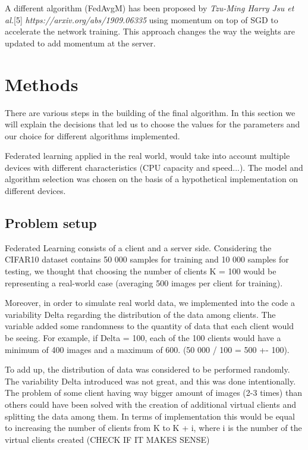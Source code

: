 \documentclass[twocolumn]{article}
\begin{document}
A different algorithm (FedAvgM) has been proposed by \emph{Tzu-Ming Harry Jsu et al.}[5] \emph{https://arxiv.org/abs/1909.06335} using momentum on top of SGD to accelerate the network training. This approach changes the way the weights are updated to add momentum at the server.

\section{Methods} %
There are various steps in the building of the final algorithm. In this section we will explain the decisions that led us to choose the values for the parameters and our choice for different algorithms implemented. 

Federated learning applied in the real world, would take into account multiple devices with different characteristics (CPU capacity and speed...). The model and algorithm selection was chosen on the basis of a hypothetical implementation on different devices.  

\subsection{Problem setup}
Federated Learning consists of a client and a server side. Considering the CIFAR10 dataset contains 50 000 samples for training and 10 000 samples for testing, we thought that choosing the number of clients K = 100 would be representing a real-world case (averaging 500 images per client for training). 

Moreover, in order to simulate real world data, we implemented into the code a variability Delta regarding the distribution of the data among clients. The variable added some randomness to the quantity of data that each client would be seeing. For example, if Delta = 100, each of the 100 clients would have a minimum of 400 images and a maximum of 600. (50 000 / 100 = 500 +- 100).


To add up, the distribution of data was considered to be performed randomly. The variability Delta introduced was not great, and this was done intentionally. The problem of some client having way bigger amount of images (2-3 times) than others could have been solved with the creation of additional virtual clients and splitting the data among them. In terms of implementation this would be equal to increasing the number of clients from K to K + i, where i is the number of the virtual clients created (CHECK IF IT MAKES SENSE) 
\end{document}
